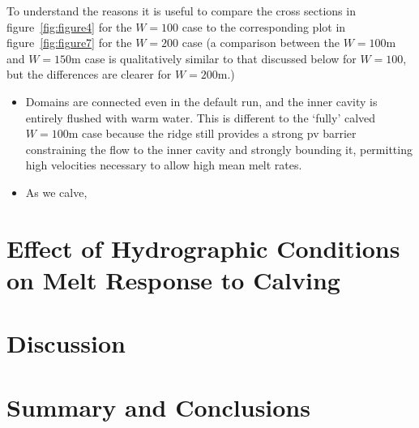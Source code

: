 \documentclass[draft]{agujournal2019}
\begin{document}
To understand the reasons it is useful to compare the cross sections in figure~\ref{fig:figure4} for the $W = 100$ case to the corresponding plot in figure~\ref{fig:figure7} for the $W = 200$ case (a comparison between the $W = 100$m and $W = 150$m case is qualitatively similar to that discussed below for $W = 100$, but the differences are clearer for $W = 200$m.)
\begin{itemize}
    \item Domains are connected even in the default run, and the inner cavity is entirely flushed with warm water. This is different to the `fully' calved $W = 100$m case because the ridge still provides a strong pv barrier constraining the flow to the inner cavity and strongly bounding it, permitting high velocities necessary to allow high mean melt rates.
    \item As we calve, 
\end{itemize}


\section{Effect of Hydrographic Conditions on Melt Response to Calving}\label{S:Results:P}

\section{Discussion}

\section{Summary and Conclusions}



%

\end{document}
